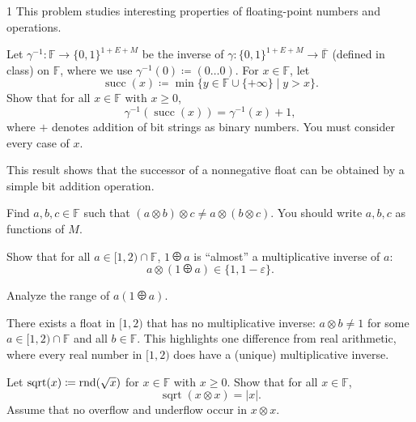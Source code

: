 \documentclass[11pt,oneside]{article}
\begin{document}
\begin{problem}{1}
This problem studies interesting properties of floating-point numbers and
operations.
\begin{problemsubparts}
\item Let $\gamma^{-1}\colon\mathbb F\to\{0, 1\}^{1+E+M}$ be the inverse
of $\gamma\colon\{0, 1\}^{1+E+M}\to\overline{\mathbb F}$
(defined in class) on $\mathbb F$, where we use
$\gamma^{-1}(0)\coloneqq(0\ldots0)$.
For $x\in\mathbb F$, let
\[
 \operatorname{succ}(x)\coloneqq
 \min\{y\in\mathbb F\cup\{+\infty\}\mid y>x\}.
\]
Show that for all $x\in\mathbb F$ with $x\ge0$,
\[
 \gamma^{-1}(\operatorname{succ}(x))=\gamma^{-1}(x)+1,
\]
where $+$ denotes addition of bit strings as binary numbers.
You must consider every case of $x$.
\begin{remark}
This result shows that the successor of a nonnegative float can be
obtained by a simple bit addition operation.
\end{remark}

\item Find $a, b, c\in\mathbb F$ such that
$(a\otimes b)\otimes c\ne a\otimes(b\otimes c)$.
You should write $a, b, c$ as functions of $M$.

\item Show that for all $a\in[1, 2)\cap\mathbb F$,
$1\odiv a$ is ``almost'' a multiplicative inverse of $a$:
\[
 a\otimes(1\odiv a)\in\{1, 1-\varepsilon\}.
\]
\begin{hint}
Analyze the range of $a(1\odiv a)$.
\end{hint}
\begin{remark}
There exists a float in $[1, 2)$ that has no multiplicative inverse:
$a\otimes b\ne1$ for some $a\in[1, 2)\cap\mathbb F$ and all
$b\in\mathbb F$. This highlights one difference from real arithmetic,
where every real number in $[1, 2)$ does have a (unique)
multiplicative inverse.
\end{remark}

\item Let $\operatorname{sqrt}(x)\coloneqq\operatorname{rnd}(\sqrt{x})$ for
$x\in\mathbb F$ with $x\ge0$. Show that for all $x\in\mathbb F$,
\[
 \operatorname{sqrt}(x\otimes x)=|x|.
\]
Assume that no overflow and underflow occur in $x\otimes x$.
\end{problemsubparts}
\end{problem}
\end{document}
